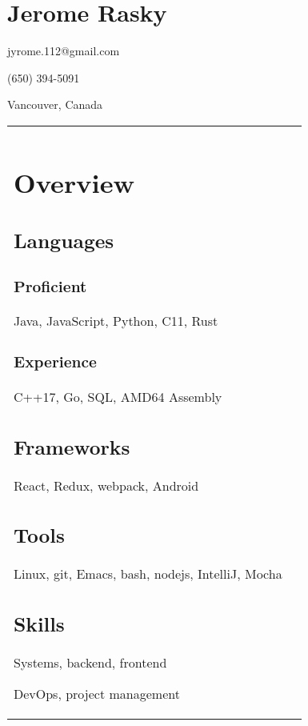 \documentclass[letterpaper]{article}
\newlength{\leftcol}
\newlength{\rightcol}
\begin{document}
\sffamily
\large
{}

\section*{\Huge Jerome Rasky}

jyrome.112@gmail.com

(650) 394-5091

Vancouver, Canada

\begin{tabularx}{\textwidth}{@{}p{\leftcol} p{\rightcol}}
\vspace*{0.5pt}
\section*{Overview}
\subsection*{Languages}

\subsubsection*{Proficient}

Java, JavaScript, Python, C11, Rust

\subsubsection*{Experience}

C++17, Go, SQL, AMD64 Assembly

\subsection*{Frameworks}

React, Redux, webpack, Android

\subsection*{Tools}

Linux, git, Emacs, bash, nodejs, IntelliJ, Mocha

\subsection*{Skills}

Systems, backend, frontend

DevOps, project management


\end{tabularx}
\end{document}
